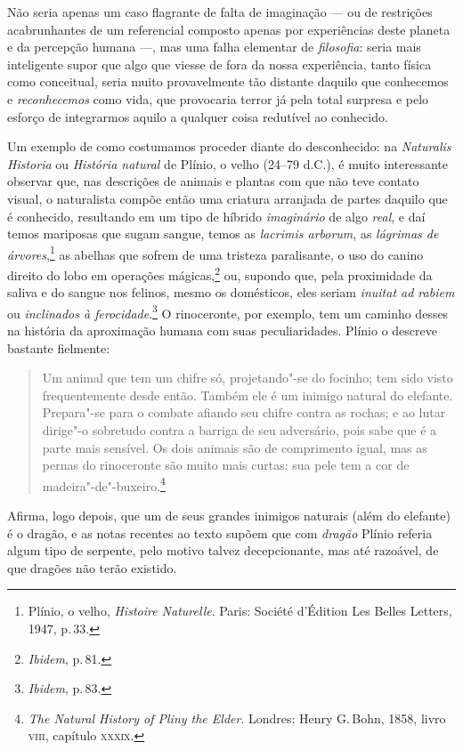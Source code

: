 Não seria apenas um caso flagrante de falta de imaginação --- ou de
restrições acabrunhantes de um referencial composto apenas por
experiências deste planeta e da percepção humana ---, mas uma falha
elementar de \textit{filosofia}: seria mais inteligente supor que algo que
viesse de fora da nossa experiência, tanto física como conceitual, seria
muito provavelmente tão distante daquilo que conhecemos e
\textit{reconhecemos} como vida, que provocaria terror já pela total
surpresa e pelo esforço de integrarmos aquilo a qualquer coisa redutível
ao conhecido.

Um exemplo de como costumamos proceder diante do desconhecido: na
\textit{Naturalis Historia} ou \textit{História natural} de Plínio, o velho (24--79
d.C.), é muito interessante observar que, nas descrições de animais e
plantas com que não teve contato visual, o naturalista compõe então uma
criatura arranjada de partes daquilo que é conhecido, resultando em um
tipo de híbrido \textit{imaginário} de algo \textit{real}, e daí temos
mariposas que sugam sangue, temos as \textit{lacrimis arborum}, as \textit{lágrimas
de árvores},\footnote{Plínio, o velho, \textit{Histoire Naturelle}. Paris: Société d'Édition Les Belles Letters, 1947, p.\,33.} as abelhas que
sofrem de uma tristeza paralisante, o uso do canino direito do lobo em
operações mágicas,\footnote{\textit{Ibidem}, p.\,81.} ou, supondo que, pela
proximidade da saliva e do sangue nos felinos, mesmo os domésticos, eles
seriam \textit{inuitat ad rabiem} ou \textit{inclinados à
ferocidade}.\footnote{\textit{Ibidem}, p.\,83.} O rinoceronte, por
exemplo, tem um caminho desses na história da aproximação humana com
suas peculiaridades. Plínio o descreve bastante fielmente:

\begin{quote}
Um animal que tem um chifre só, projetando"-se do focinho; tem sido visto
frequentemente desde então. Também ele é um inimigo natural do elefante.
Prepara"-se para o combate afiando seu chifre contra as rochas; e ao
lutar dirige"-o sobretudo contra a barriga de seu adversário, pois sabe
que é a parte mais sensível. Os dois animais são de comprimento igual,
mas as pernas do rinoceronte são muito mais curtas: sua pele tem a cor
de madeira"-de"-buxeiro.\footnote{\textit{The Natural History of Pliny the
  Elder}. Londres: Henry G.\,Bohn, 1858, livro \textsc{viii}, capítulo \textsc{xxxix}.}
\end{quote}

Afirma, logo depois, que um de seus grandes inimigos naturais (além do
elefante) é o dragão, e as notas recentes ao texto supõem que com
\textit{dragão} Plínio referia algum tipo de serpente, pelo motivo talvez
decepcionante, mas até razoável, de que dragões não terão existido.

